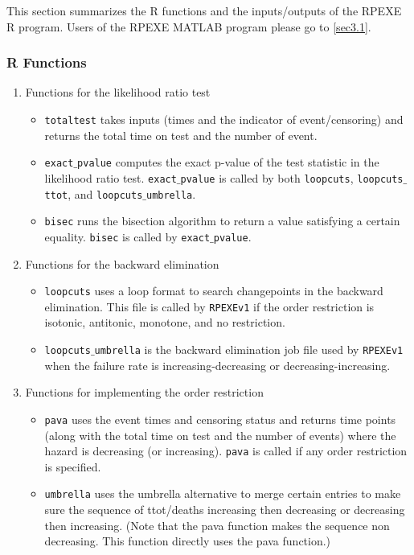 \documentclass[12pt] {article}
\begin{document}
This section summarizes the R functions and the inputs/outputs of the
RPEXE R program. Users of the RPEXE MATLAB program please go to
\ref{sec3.1}.


\subsubsection{R Functions}
\begin{enumerate}

\item Functions for the likelihood ratio test
\begin{itemize}
\item {\tt totaltest} takes inputs (times and the indicator of event/censoring) and returns the total time on test and the number of event.
\item {\tt exact$\_$pvalue} computes the exact p-value of the test statistic
    in the likelihood ratio test. {\tt exact$\_$pvalue} is called by both
    {\tt loopcuts}, {\tt loopcuts$\_$ttot}, and {\tt loopcuts$\_$umbrella}.
\item {\tt bisec} runs the bisection algorithm to return a value satisfying
    a certain equality. {\tt bisec} is called by {\tt exact$\_$pvalue}.
\end{itemize}

\item Functions for the backward elimination
\begin{itemize}
\item {\tt loopcuts} uses a loop format to search changepoints in the backward elimination. This file is called by {\tt RPEXEv1} if the order restriction
    is isotonic, antitonic, monotone, and no restriction.
\item {\tt loopcuts$\_$umbrella} is the backward elimination job file
    used by {\tt RPEXEv1} when the failure rate is increasing-decreasing or
    decreasing-increasing.
\end{itemize}

\item Functions for implementing the order restriction
\begin{itemize}
\item {\tt pava} uses the event times and censoring status and returns time points (along with the total time on test and the number of events) where the hazard is decreasing (or increasing). {\tt pava} is called if any order restriction is specified.

\item {\tt umbrella} uses the umbrella alternative to merge certain entries to make sure the sequence of ttot/deaths increasing then decreasing or decreasing then increasing. (Note that the pava function makes the sequence non decreasing.  This function directly uses the pava function.)


\end{itemize}
\end{enumerate}
\end{document}
